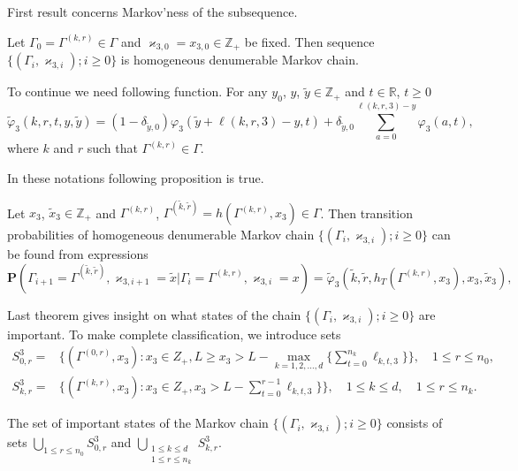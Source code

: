 \documentclass[10pt]{article}
\renewcommand{\Pr}{{\mathbf P}}
\begin{document}
First result concerns Markov'ness of the subsequence.
\begin{thm}
Let $\Gamma_0=\Gamma^{(k,r)}\in \Gamma$ and $\varkappa_{3,0}=x_{3,0}\in \mathbb{Z}_+$ be fixed. Then sequence $\{(\Gamma_i, \varkappa_{3, i}); i \geqslant 0\}$ is homogeneous denumerable Markov chain.
\end{thm}

To continue we need following function.
For any $y_0$, $y$, $\tilde{y} \in \mathbb{Z}_+$ and $t \in \mathbb{R}$, $t\geqslant 0$ 
\begin{equation}
\widetilde{\varphi}_3(k,r,t,y,\tilde{y}) = (1-\delta_{\tilde{y},0}) \varphi_3(\tilde{y} + \ell(k,r,3)-y,t)  +\delta_{\tilde{y},0}\sum_{a=0}^{\ell(k,r,3)-y} \varphi_3(a,t),
\label{tildephi}
\end{equation}
where $k$ and $r$ such that $\Gamma^{(k,r)}\in \Gamma$.

In these notations following proposition is true.
\begin{thm}
Let $x_3$, $\tilde{x}_3\in \mathbb{Z}_+$ and $\Gamma^{(k,r)}$, $\Gamma^{(\tilde{k},\tilde{r})}=h(\Gamma^{(k,r)},x_3) \in \Gamma$. Then transition probabilities of  homogeneous denumerable Markov chain $\{(\Gamma_i, \varkappa_{3, i}); i \geqslant 0\}$ can be found from expressions
\begin{equation}
\Pr (\Gamma_{i+1}=\Gamma^{(\tilde{k},\tilde{r})},\varkappa_{3,i+1}=\tilde{x}|\Gamma_{i}=\Gamma^{(k,r)},\varkappa_{3,i}=x) 
= \widetilde{\varphi}_3(\tilde{k},\tilde{r},h_T(\Gamma^{(k,r)},x_3),x_3,\tilde{x}_3),
\label{transitionToProve:three}
\end{equation}
\end{thm}

Last theorem gives insight on what states of the chain $\{(\Gamma_i, \varkappa_{3, i}); i \geqslant 0\}$ are important. To make complete classification, we introduce sets
\begin{equation*}
\begin{aligned}
S^3_{0,r} = & \{(\Gamma^{(0,r)},x_3) \colon x_3\in Z_+, L \geqslant x_3 > L - \max\limits_{k=1, 2, \ldots, d}\{\sum_{t=0}^{n_k} \ell_{k,t,3}\}\}, \quad 1 \leqslant r \leqslant n_0, \\
S^3_{k,r} = & \{(\Gamma^{(k,r)},x_3) \colon x_3\in Z_+, x_3 > L - \sum_{t=0}^{r-1} \ell_{k,t,3}\} \}, \quad 1 \leqslant k \leqslant d, \quad 1 \leqslant r \leqslant n_k.
\end{aligned}
\end{equation*}

\begin{thm}
The set of important states of the Markov chain $\{(\Gamma_i, \varkappa_{3, i}); i \geqslant 0\}$  consists of sets $\bigcup\limits_{1 \leqslant r \leqslant n_0}S^3_{0,r}$ and $\bigcup\limits_{\substack{1 \leqslant k \leqslant d\\ 1 \leqslant r \leqslant n_k}} S^3_{k,r}$.
\end{thm}
\end{document}
